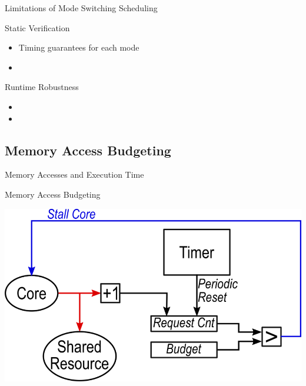 \begin{frame}{Limitations of Mode Switching Scheduling}

\pause
\begin{block}{Static Verification}
\begin{itemize}
    \item<3-> Timing guarantees for each mode
    \item<4-> 
\end{itemize}
\end{block}

\begin{block}{Runtime Robustness}
\begin{itemize}
    \item<5-> 
    \item<6-> 
\end{itemize}
\end{block}

\end{frame}


\subsection{Memory Access Budgeting}

\begin{frame}{Memory Accesses and Execution Time}

\end{frame}

\begin{frame}{Memory Access Budgeting}

\includegraphics[width=\textwidth]{Figures/budgeting-robin}

\end{frame}


